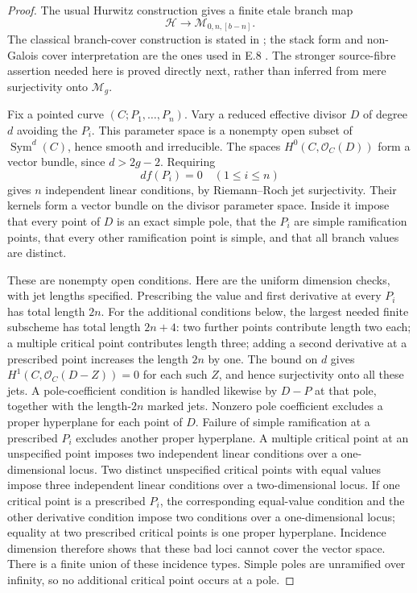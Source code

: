 \begin{proof}
The usual Hurwitz construction gives a finite etale branch map
\[
 \mathcal H\longrightarrow\mathcal M_{0,n,[b-n]}.
                                                               \tag{E.13.6}
\]
The classical branch-cover construction is stated in
\citet[\S1.1, pp.~313--314]{E_RomagnyWewers2006}; the stack form
and non-Galois cover interpretation are the ones used in E.8
\citep[Proposition 6.14; Theorem 6.20]{E_BR2007}.
The stronger source-fibre assertion needed here is proved directly next,
rather than inferred from mere surjectivity onto $\mathcal M_g$.

Fix a pointed curve $(C;P_1,\ldots,P_n)$. Vary a reduced effective
divisor $D$ of degree $d$ avoiding the $P_i$. This parameter space is
a nonempty open subset of $\operatorname{Sym}^d(C)$, hence smooth
and irreducible. The spaces $H^0(C,\mathcal O_C(D))$ form a vector
bundle, since $d>2g-2$. Requiring
\[
                         df(P_i)=0\quad(1\le i\le n)
\]
gives $n$ independent linear conditions, by Riemann--Roch jet
surjectivity. Their kernels form a vector bundle on the divisor
parameter space. Inside it impose that every point of $D$ is an exact
simple pole, that the $P_i$ are simple ramification points, that every
other ramification point is simple, and that all branch values are
distinct.

These are nonempty open conditions. Here are the uniform dimension
checks, with jet lengths specified. Prescribing the value and first
derivative at every $P_i$ has total length $2n$. For the additional
conditions below, the largest needed finite subscheme has total length
$2n+4$: two further points contribute length two each; a multiple
critical point contributes length three; adding a second derivative
at a prescribed point increases the length $2n$ by one. The bound on
$d$ gives $H^1(C,\mathcal O_C(D-Z))=0$ for each such $Z$, and hence
surjectivity onto all these jets. A pole-coefficient condition is
handled likewise by $D-P$ at that pole, together with the length-$2n$
marked jets. Nonzero pole coefficient excludes a
proper hyperplane for each point of $D$. Failure of simple ramification
at a prescribed $P_i$ excludes another proper hyperplane. A multiple
critical point at an unspecified point imposes two independent linear
conditions over a one-dimensional locus. Two distinct unspecified
critical points with equal values impose three independent linear
conditions over a two-dimensional locus. If one critical point is a
prescribed $P_i$, the corresponding equal-value condition and the
other derivative condition impose two conditions over a one-dimensional
locus; equality at two prescribed critical points is one proper
hyperplane. Incidence dimension therefore shows that these bad loci
cannot cover the vector space. There is a finite union of these
incidence types. Simple poles are unramified over infinity, so no
additional critical point occurs at a pole.


\end{proof}
